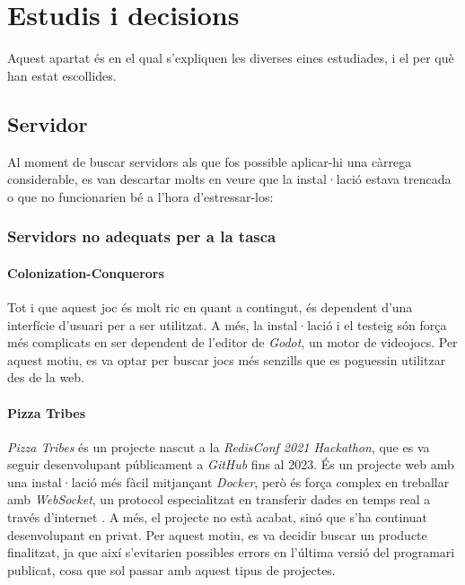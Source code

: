 \chapter{Estudis i decisions}
\label{cap:9}

Aquest apartat és en el qual s'expliquen les diverses eines estudiades, i el per què han estat escollides.

\section{Servidor}

Al moment de buscar servidors als que fos possible aplicar-hi una càrrega considerable, es van descartar molts en veure que la instal·lació estava trencada o que no funcionarien bé a l'hora d'estressar-los:
\subsection{Servidors no adequats per a la tasca}

\subsubsection{Colonization-Conquerors}

Tot i que aquest joc és molt ric en quant a contingut, és dependent d'una interfície d'usuari per a ser utilitzat. A més, la instal·lació i el testeig són força més complicats en ser dependent de l'editor de \textit{Godot}, un motor de videojocs. Per aquest motiu, es va optar per buscar jocs més senzills que es poguessin utilitzar des de la web.\cite{enders_timdenderscolonization-conquerors_2024}

\subsubsection{Pizza Tribes}

\textit{Pizza Tribes} és un projecte nascut a la \textit{RedisConf 2021 Hackathon}, que es va seguir desenvolupant públicament a \textit{GitHub} fins al 2023. És un projecte web amb una instal·lació més fàcil mitjançant \textit{Docker}, però és força complex en treballar amb \textit{WebSocket}, un protocol especialitzat en transferir dades en temps real a través d'internet \cite{wang_websocket_2013}. A més, el projecte no està acabat, sinó que s'ha continuat desenvolupant en privat. Per aquest motiu, es va decidir buscar un producte finalitzat, ja que així s'evitarien possibles errors en l'última versió del programari publicat, cosa que sol passar amb aquest tipus de projectes.\cite{noauthor_fnattepizza-tribes_nodate}


